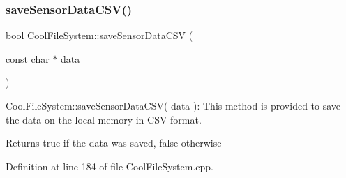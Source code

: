 \subsubsection{\texorpdfstring{save\+Sensor\+Data\+C\+S\+V()}{saveSensorDataCSV()}}
{\footnotesize\ttfamily bool Cool\+File\+System\+::save\+Sensor\+Data\+C\+SV (\begin{DoxyParamCaption}\item[{const char $\ast$}]{data }\end{DoxyParamCaption})}

Cool\+File\+System\+::save\+Sensor\+Data\+C\+S\+V( data )\+: This method is provided to save the data on the local memory in C\+SV format.

\begin{DoxyReturn}{Returns}
true if the data was saved, false otherwise 
\end{DoxyReturn}


Definition at line 184 of file Cool\+File\+System.\+cpp.


